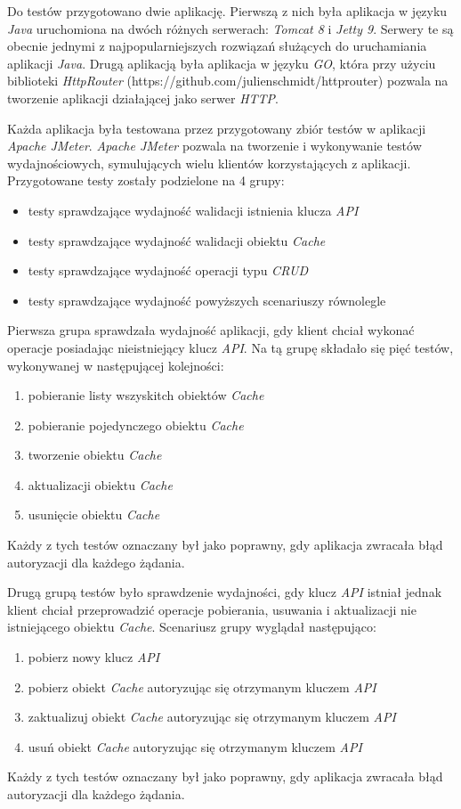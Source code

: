 Do testów przygotowano dwie aplikację. Pierwszą z nich była aplikacja w języku \textsl{Java} uruchomiona na dwóch różnych serwerach: \textsl{Tomcat 8} i \textsl{Jetty 9}. Serwery te są obecnie jednymi z najpopularniejszych rozwiązań służących do uruchamiania aplikacji \textsl{Java}.  Drugą aplikacją była aplikacja w języku \textsl{GO}, która przy użyciu biblioteki \textsl{HttpRouter} (https://github.com/julienschmidt/httprouter) pozwala na tworzenie aplikacji działającej jako serwer \textsl{HTTP}.

Każda aplikacja była testowana przez przygotowany zbiór testów w aplikacji \textsl{Apache JMeter}. \textsl{Apache JMeter} pozwala na tworzenie i wykonywanie testów wydajnościowych, symulujących wielu klientów korzystających z aplikacji. Przygotowane testy zostały podzielone na 4 grupy:
\begin{itemize}
    \item testy sprawdzające wydajność walidacji istnienia klucza \textsl{API}
    \item testy sprawdzające wydajność walidacji obiektu \textsl{Cache}
    \item testy sprawdzające wydajność operacji typu \textsl{CRUD}
    \item testy sprawdzające wydajność powyższych scenariuszy równolegle
\end{itemize}

Pierwsza grupa sprawdzała wydajność aplikacji, gdy klient chciał wykonać operacje posiadając nieistniejący klucz \textsl{API}. Na tą grupę składało się pięć testów, wykonywanej w następującej kolejności:
\begin{enumerate}
    \item pobieranie listy wszyskitch obiektów \textsl{Cache}
    \item pobieranie pojedynczego obiektu \textsl{Cache}
    \item tworzenie obiektu \textsl{Cache}
    \item aktualizacji obiektu \textsl{Cache} 
    \item usunięcie obiektu \textsl{Cache}
\end{enumerate}
Każdy z tych testów oznaczany był jako poprawny, gdy aplikacja zwracała błąd autoryzacji dla każdego żądania.

Drugą grupą testów było sprawdzenie wydajności, gdy klucz \textsl{API} istniał jednak klient chciał przeprowadzić operacje pobierania, usuwania i aktualizacji nie istniejącego obiektu \textsl{Cache}. Scenariusz grupy wyglądał następująco:
\begin{enumerate}
    \item pobierz nowy klucz \textsl{API}
    \item pobierz obiekt \textsl{Cache} autoryzując się otrzymanym kluczem \textsl{API}
    \item zaktualizuj obiekt \textsl{Cache} autoryzując się otrzymanym kluczem \textsl{API}
    \item usuń obiekt \textsl{Cache} autoryzując się otrzymanym kluczem \textsl{API}
\end{enumerate}
Każdy z tych testów oznaczany był jako poprawny, gdy aplikacja zwracała błąd autoryzacji dla każdego żądania.

